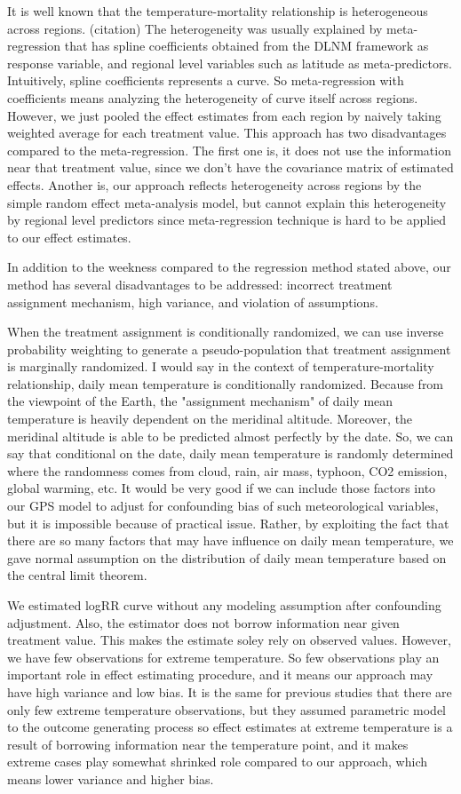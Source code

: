 \documentclass[12pt]{article}
\begin{document}
It is well known that the temperature-mortality relationship is heterogeneous across regions. (citation)
The heterogeneity was usually explained by meta-regression
that has spline coefficients obtained from the DLNM framework as response variable, 
and regional level variables such as latitude as meta-predictors.
Intuitively, spline coefficients represents a curve.
So meta-regression with coefficients means analyzing the heterogeneity of curve itself across regions.
However, we just pooled the effect estimates from each region 
by naively taking weighted average for each treatment value.
This approach has two disadvantages compared to the meta-regression.
The first one is, it does not use the information near that treatment value,
since we don't have the covariance matrix of estimated effects.
Another is, our approach reflects heterogeneity across regions by the simple random effect meta-analysis model, 
but cannot explain this heterogeneity by regional level predictors
since meta-regression technique is hard to be applied to our effect estimates.

In addition to the weekness compared to the regression method stated above,
our method has several disadvantages to be addressed:
incorrect treatment assignment mechanism, high variance, and violation of assumptions.

When the treatment assignment is conditionally randomized, 
we can use inverse probability weighting to generate a pseudo-population
that treatment assignment is marginally randomized.
I would say in the context of temperature-mortality relationship,
daily mean temperature is conditionally randomized.
Because from the viewpoint of the Earth, 
the "assignment mechanism" of daily mean temperature is heavily dependent on the meridinal altitude.
Moreover, the meridinal altitude is able to be predicted almost perfectly by the date.
So, we can say that conditional on the date, daily mean temperature is randomly determined
where the randomness comes from cloud, rain, air mass, typhoon, CO2 emission, global warming, etc.
It would be very good if we can include those factors into our GPS model 
to adjust for confounding bias of such meteorological variables,
but it is impossible because of practical issue.
Rather, by exploiting the fact that 
there are so many factors that may have influence on daily mean temperature,
we gave normal assumption on the distribution of daily mean temperature 
based on the central limit theorem.

We estimated logRR curve without any modeling assumption after confounding adjustment.
Also, the estimator does not borrow information near given treatment value.
This makes the estimate soley rely on observed values.
However, we have few observations for extreme temperature.
So few observations play an important role in effect estimating procedure,
and it means our approach may have high variance and low bias.
It is the same for previous studies that there are only few extreme temperature observations,
but they assumed parametric model to the outcome generating process
so effect estimates at extreme temperature is a result of borrowing information near the temperature point,
and it makes extreme cases play somewhat shrinked role compared to our approach,
which means lower variance and higher bias.
\end{document}
